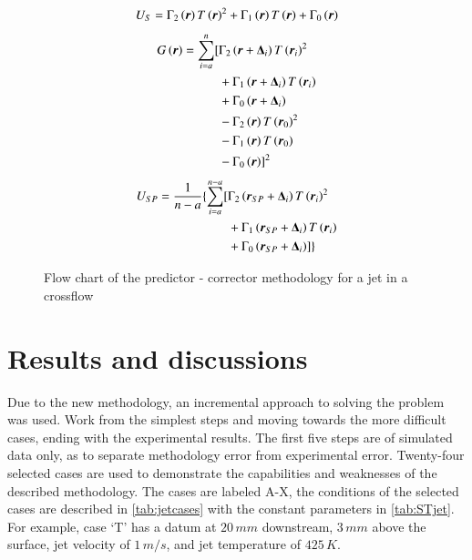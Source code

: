 \documentclass[preprint,12pt]{elsarticle}
\newcommand{\bv}[1]{\boldsymbol #1}  %
\begin{document}
\begin{equation}
\centering
U_S = \Gamma_2 \left(\bv r \right) T\left( \bv r \right)^2 +  \Gamma_1 \left(\bv r \right) T\left( \bv r \right) + \Gamma_0 \left(\bv r \right)
\label{eq:Us}
\end{equation}
%
\begin{equation}
\centering
\begin{split}
G\left( \bv r \right) =  \sum^{n}_{i=a} [ &\Gamma_2\left( \bv r + \bv{\Delta_i}  \right) T\left( \bv{r_i} \right)^2 \\
&+\Gamma_1\left( \bv r + \bv{\Delta_i}  \right) T\left( \bv{r_i} \right) \\
&+\Gamma_0\left( \bv r + \bv{\Delta_i} \right) \\
&-\Gamma_2\left( \bv r \right) T\left( \bv{r_0} \right)^2 \\
&-\Gamma_1\left( \bv r \right) T\left( \bv{r_0} \right)\\
&- \Gamma_0\left( \bv r \right) ]^2  
\label{eq:G}
\end{split}
\end{equation}
%
\begin{equation}
\centering
\begin{split}
U_{SP} = \frac{1}{n-a} \{ \sum^{n-a}_{i=a} [ &\Gamma_2 \left( \bv{r_{SP}}+ \bv{\Delta_i} \right) T\left( \bv{r_i}\right)^2  \\
&+\Gamma_1 \left( \bv{r_{SP}}+ \bv{\Delta_i} \right) T\left( \bv{r_i}\right) \\
&+ \Gamma_0\left( \bv{r_{SP}}+ \bv{\Delta_i}  \right) ] \}
\label{eq:Usp}
\end{split}
\end{equation}

\begin{figure}[!tbp]
\centering

\caption{Flow chart of the predictor - corrector methodology for a jet in a crossflow}
\label{fig:flowchartjet}
\end{figure}


\section{Results and discussions}
Due to the new methodology, an incremental approach to solving the problem was used.  Work from the simplest steps and moving towards the more difficult cases, ending with the experimental results.  The first five steps are of simulated data only, as to separate methodology error from experimental error.  Twenty-four selected cases are used to demonstrate the capabilities and weaknesses of the described methodology.  The cases are labeled A-X, the conditions of the selected cases are described in \cref{tab:jetcases} with the constant parameters in \cref{tab:STjet}.  For example, case `T' has a datum at $20\,mm$ downstream, $3\,mm$ above the surface, jet velocity of $1\,m/s$, and jet temperature of $425\,K$.
\end{document}
